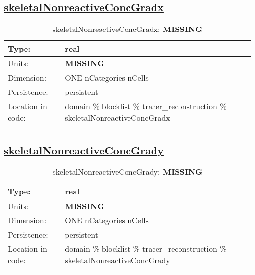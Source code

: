\subsection[skeletalNonreactiveConcGradx]{\hyperref[sec:var_tab_tracer_reconstruction]{skeletalNonreactiveConcGradx}}
\label{subsec:var_sec_tracer_reconstruction_skeletalNonreactiveConcGradx}
\begin{center}
\begin{longtable}{| p{2.0in} | p{4.0in} |}
        \hline 
        Type: & real \\
        \hline 
        Units: & {\bf \color{red} MISSING} \\
        \hline 
        Dimension: & ONE nCategories nCells \\
        \hline 
        Persistence: & persistent \\
        \hline 
         Location in code: & domain \% blocklist \% tracer\_reconstruction \% skeletalNonreactiveConcGradx \\
         \hline 
    \caption{skeletalNonreactiveConcGradx: {\bf \color{red} MISSING}}
\end{longtable}
\end{center}
\subsection[skeletalNonreactiveConcGrady]{\hyperref[sec:var_tab_tracer_reconstruction]{skeletalNonreactiveConcGrady}}
\label{subsec:var_sec_tracer_reconstruction_skeletalNonreactiveConcGrady}
\begin{center}
\begin{longtable}{| p{2.0in} | p{4.0in} |}
        \hline 
        Type: & real \\
        \hline 
        Units: & {\bf \color{red} MISSING} \\
        \hline 
        Dimension: & ONE nCategories nCells \\
        \hline 
        Persistence: & persistent \\
        \hline 
         Location in code: & domain \% blocklist \% tracer\_reconstruction \% skeletalNonreactiveConcGrady \\
         \hline 
    \caption{skeletalNonreactiveConcGrady: {\bf \color{red} MISSING}}
\end{longtable}
\end{center}
